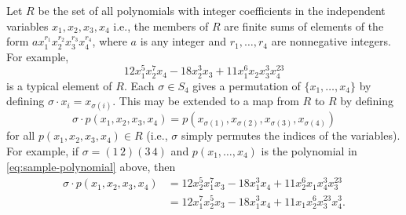  Let $R$ be the set of all polynomials with integer
coefficients in the independent variables $x_1,x_2,x_3,x_4$ i.e., the
members of $R$ are finite sums of elements of the form
$ax_1^{r_1}x_2^{r_2}x_3^{r_3}x_4^{r_4}$, where $a$ is any integer and
$r_1,\dots, r_4$ are nonnegative integers. For example,
\begin{equation}
  \label{eq:sample-polynomial}
  12x_1^5x_2^7x_4 - 18x_2^3x_3 + 11x_1^6x_2x_3^3x_4^{23}
\end{equation}
is a typical element of $R$. Each $\sigma\in S_4$ gives a permutation
of $\{x_1,\dots,x_4\}$ by defining $\sigma\cdot x_i =
x_{\sigma(i)}$. This may be extended to a map from $R$ to $R$ by
defining
\begin{equation*}
  \sigma\cdot p(x_1,x_2,x_3,x_4)
  = p(x_{\sigma(1)},x_{\sigma(2)},x_{\sigma(3)},x_{\sigma(4)})
\end{equation*}
for all $p(x_1,x_2,x_3,x_4)\in R$ (i.e., $\sigma$ simply permutes the
indices of the variables). For example, if $\sigma = (1\,2)(3\,4)$ and
$p(x_1,\dots,x_4)$ is the polynomial in \eqref{eq:sample-polynomial}
above, then
\begin{align*}
  \sigma\cdot p(x_1,x_2,x_3,x_4)
  &= 12x_2^5x_1^7x_3 - 18x_1^3x_4 + 11x_2^6x_1x_4^3x_3^{23} \\
  &= 12x_1^7x_2^5x_3 - 18x_1^3x_4 + 11x_1x_2^6x_3^{23}x_4^3.
\end{align*}
